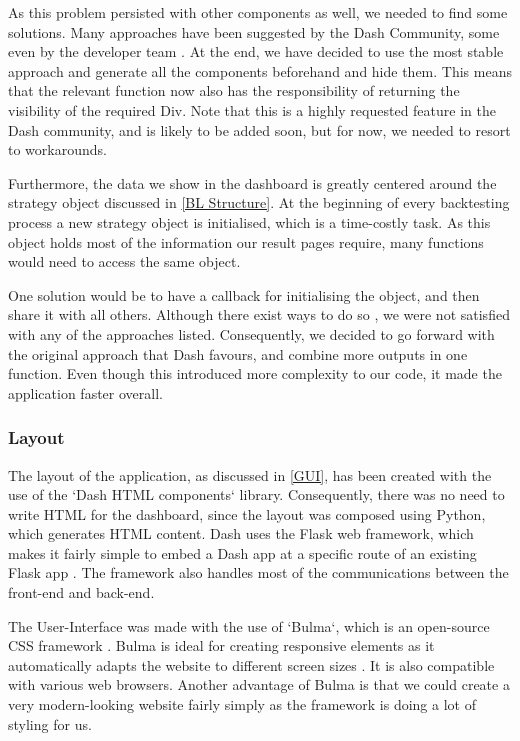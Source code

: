 \documentclass[main.tex]{subfiles}
\begin{document}
As this problem persisted with other components as well, we needed to find some solutions. Many approaches have been suggested by the Dash Community, some even by the developer team \cite{dash_workaround}. At the end, we have decided to use the most stable approach and generate all the components beforehand and hide them. This means that the relevant function now also has the responsibility of returning the visibility of the required Div. Note that this is a highly requested feature in the Dash community, and is likely to be added soon, but for now, we needed to resort to workarounds.

Furthermore, the data we show in the dashboard is greatly centered around the strategy object discussed in \ref{BL Structure}. At the beginning of every backtesting process a new strategy object is initialised, which is a time-costly task. As this object holds most of the information our result pages require, many functions would need to access the same object. 

One solution would be to have a callback for initialising the object, and then share it with all others. Although there exist ways to do so \cite{dash_share}, we were not satisfied with any of the approaches listed. Consequently, we decided to go forward with the original approach that Dash favours, and combine more outputs in one function. Even though this introduced more complexity to our code, it made the application faster overall.

\subsubsection*{Layout}

The layout of the application, as discussed in \ref{GUI}, has been created with the use of the `Dash HTML components` library. Consequently, there was no need to write HTML for the dashboard, since the layout was composed using Python, which generates HTML content. Dash uses the Flask web framework, which makes it fairly simple to embed a Dash app at a specific route of an existing Flask app \cite{flask-dash}. The framework also handles most of the communications between the front-end and back-end.

The User-Interface was made with the use of `Bulma`, which is an open-source CSS framework \cite{bulma}. Bulma is ideal for creating responsive elements as it automatically adapts the website to different screen sizes \cite{responsiveness_2020}. It is also compatible with various web browsers. Another advantage of Bulma is that we could create a very modern-looking website fairly simply as the framework is doing a lot of styling for us.
\end{document}
